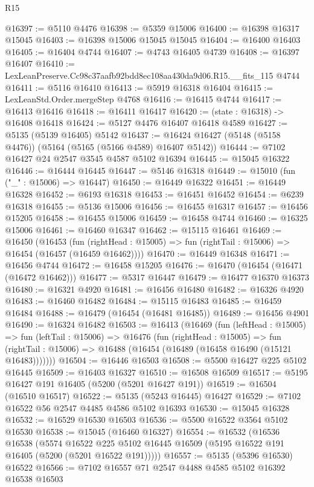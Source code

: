 \begin{lexlean}{R15}
\begin{coremodule}
{{{{{{{{{{{@16397 := @5110 @4476
@16398 := @5359 @15006
@16400 := @16398 @16317 @15045
@16403 := @16398 @15006 @15045 @15045
@16404 := @16400 @16403
@16405 := @16404 @4744
@16407 := @4743 @16405 @4739
@16408 := @16397 @16407
@16410 := LexLeanPreserve.Cc98c37aafb92bdd8ec108aa430da9d06.R15.__fits_115 @4744
@16411 := @5116 @16410
@16413 := @5919 @16318 @16404
@16415 := LexLeanStd.Order.mergeStep @4768
@16416 := @16415 @4744
@16417 := @16413 @16416
@16418 := @16411 @16417
@16420 := (state : @16318) -> @16408 @16418
@16424 := @5127 @4476 @16407 @16418 @4589
@16427 := @5135 (@5139 @16405) @5142
@16437 := @16424 @16427 (@5148 (@5158 @4476)) (@5164 (@5165 (@5166 @4589) @16407 @5142))
@16444 := @7102 @16427 @24 @2547 @3545 @4587 @5102 @16394
@16445 := @15045 @16322
@16446 := @16444 @16445
@16447 := @5146 @16318
@16449 := @15010 (fun ("_" : @15006) => @16447)
@16450 := @16449 @16322
@16451 := @16449 @16328
@16452 := @6193 @16318
@16453 := @16451 @16452
@16454 := @6239 @16318
@16455 := @5136 @15006
@16456 := @16455 @16317
@16457 := @16456 @15205
@16458 := @16455 @15006
@16459 := @16458 @4744
@16460 := @16325 @15006
@16461 := @16460 @16347
@16462 := @15115 @16461
@16469 := @16450
    (@16453
      (fun (rightHead : @15005) => fun (rightTail : @15006) => @16454 (@16457 (@16459 @16462))))
@16470 := @16449 @16348
@16471 := @16456 @4744
@16472 := @16458 @15205
@16476 := @16470 (@16454 (@16471 (@16472 @16462)))
@16477 := @5317 @16447
@16479 := @16477 @16370 @16373
@16480 := @16321 @4920
@16481 := @16456 @16480
@16482 := @16326 @4920
@16483 := @16460 @16482
@16484 := @15115 @16483
@16485 := @16459 @16484
@16488 := @16479 (@16454 (@16481 @16485))
@16489 := @16456 @4901
@16490 := @16324 @16482
@16503 := @16413
    (@16469
      (fun (leftHead : @15005) =>
      fun (leftTail : @15006) =>
      @16476
        (fun (rightHead : @15005) =>
        fun (rightTail : @15006) => @16488 (@16454 (@16489 (@16458 @16490 (@15121 @16483)))))))
@16504 := @16446 @16503
@16508 := @5500 @16427 @225 @5102 @16445
@16509 := @16403 @16327
@16510 := @16508 @16509
@16517 := @5195 @16427 @191 @16405 (@5200 (@5201 @16427 @191))
@16519 := @16504 (@16510 @16517)
@16522 := @5135 (@5243 @16445) @16427
@16529 := @7102 @16522 @56 @2547 @4485 @4586 @5102 @16393
@16530 := @15045 @16328
@16532 := @16529 @16530 @16503
@16536 := @5500 @16522 @3564 @5102 @16530
@16538 := @15045 (@16460 @16327)
@16554 := @16532
    (@16536
      @16538
      (@5574
        @16522
        @225
        @5102
        @16445
        @16509
        (@5195 @16522 @191 @16405 (@5200 (@5201 @16522 @191)))))
@16557 := @5135 (@5396 @16530) @16522
@16566 := @7102 @16557 @71 @2547 @4488 @4585 @5102 @16392 @16538 @16503
}}}}}}}}}}}
\end{coremodule}
\end{lexlean}
